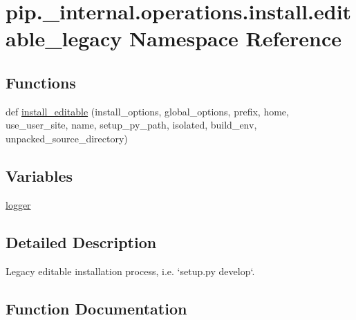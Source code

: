 \hypertarget{namespacepip_1_1__internal_1_1operations_1_1install_1_1editable__legacy}{}\section{pip.\+\_\+internal.\+operations.\+install.\+editable\+\_\+legacy Namespace Reference}
\label{namespacepip_1_1__internal_1_1operations_1_1install_1_1editable__legacy}
\subsection*{Functions}
\begin{DoxyCompactItemize}
\item 
def \hyperlink{namespacepip_1_1__internal_1_1operations_1_1install_1_1editable__legacy_aa69d3b30ba26cc7729f81548b7e7b09a}{install\+\_\+editable} (install\+\_\+options, global\+\_\+options, prefix, home, use\+\_\+user\+\_\+site, name, setup\+\_\+py\+\_\+path, isolated, build\+\_\+env, unpacked\+\_\+source\+\_\+directory)
\end{DoxyCompactItemize}
\subsection*{Variables}
\begin{DoxyCompactItemize}
\item 
\hyperlink{namespacepip_1_1__internal_1_1operations_1_1install_1_1editable__legacy_add0d611297ed481285809c0c2fb1dc46}{logger}
\end{DoxyCompactItemize}


\subsection{Detailed Description}
\begin{DoxyVerb}Legacy editable installation process, i.e. `setup.py develop`.
\end{DoxyVerb}
 

\subsection{Function Documentation}
\mbox{\label{namespacepip_1_1__internal_1_1operations_1_1install_1_1editable__legacy_aa69d3b30ba26cc7729f81548b7e7b09a}} 
